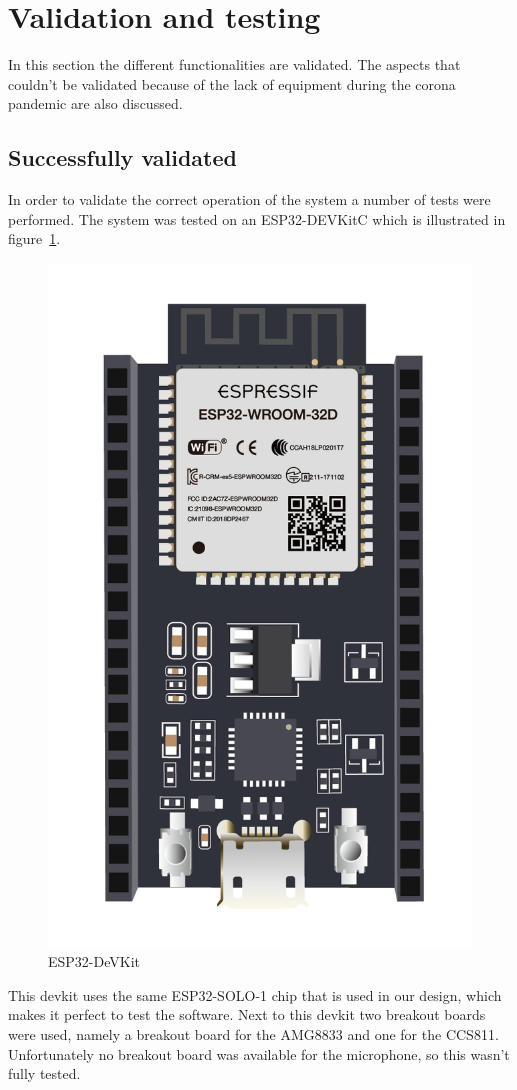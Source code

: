\documentclass[11pt,a4paper]{article}
\begin{document}
\section{Validation and testing}
In this section the different functionalities are validated. The aspects that couldn't be validated because of the lack of equipment during the corona pandemic are also discussed. 
\subsection{Successfully validated}
In order to validate the correct operation of the system a number of tests were performed. The system was tested on an ESP32-DEVKitC which is illustrated in figure~\ref{fig:devkit}.
\begin{figure}[H]
	\centering
	\includegraphics[angle=90,width=1.0\linewidth]{devkit.png}
	\caption{ESP32-DeVKit~\cite{devkit}}
	\label{fig:devkit}
\end{figure}
This devkit uses the same ESP32-SOLO-1 chip that is used in our design, which makes it perfect to test the software. Next to this devkit two breakout boards were used, namely a breakout board for the AMG8833 and one for the CCS811. Unfortunately no breakout board was available for the microphone, so this wasn't fully tested. 
\end{document}
